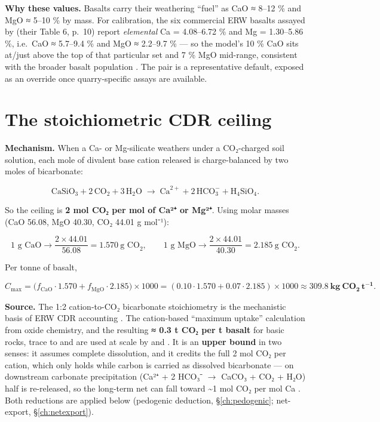 \documentclass[openany]{book}
\begin{document}
\textbf{Why these values.} Basalts carry their weathering ``fuel'' as CaO ≈
8--12 \% and MgO ≈ 5--10 \% by mass. For calibration, the six commercial ERW
basalts assayed by \citet{lewis2021} (their Table 6, p.~10) report
\emph{elemental} Ca = 4.08--6.72 \% and Mg = 1.30--5.86 \%, i.e.~CaO ≈ 5.7--9.4
\% and MgO ≈ 2.2--9.7 \% --- so the model's 10 \% CaO sits at/just above the top
of that particular set and 7 \% MgO mid-range, consistent with the broader
basalt population \citep[Abstract p.~229]{renforth2012}. The pair is a
representative default, exposed as an override once quarry-specific assays are
available.

\chapter{The stoichiometric CDR ceiling}\label{ch:ceiling}

\textbf{Mechanism.} When a Ca- or Mg-silicate weathers under a CO₂-charged soil
solution, each mole of divalent base cation released is charge-balanced by two
moles of bicarbonate:

\[
\text{CaSiO}_3 + 2\,\text{CO}_2 + 3\,\text{H}_2\text{O}
\;\rightarrow\;
\text{Ca}^{2+} + 2\,\text{HCO}_3^- + \text{H}_4\text{SiO}_4 .
\]

So the ceiling is \textbf{2 mol CO₂ per mol of Ca²⁺ or Mg²⁺}. Using molar masses
(CaO 56.08, MgO 40.30, CO₂ 44.01 g mol⁻¹):

\[
\text{1 g CaO} \rightarrow \frac{2\times 44.01}{56.08} = 1.570\ \text{g CO}_2,
\qquad
\text{1 g MgO} \rightarrow \frac{2\times 44.01}{40.30} = 2.185\ \text{g CO}_2 .
\]

Per tonne of basalt,

\[
C_{\max} = \big(f_{\text{CaO}}\cdot 1.570 + f_{\text{MgO}}\cdot 2.185\big)\times 1000
= (0.10\cdot1.570 + 0.07\cdot2.185)\times1000 \approx \mathbf{309.8\ kg\ CO_2\,t^{-1}} .
\]

\textbf{Source.} The 1:2 cation-to-CO₂ bicarbonate stoichiometry is the
mechanistic basis of ERW CDR accounting \citep{hartmann2013}. The cation-based
``maximum uptake'' calculation from oxide chemistry, and the resulting
\textbf{≈ 0.3 t CO₂ per t basalt} for basic rocks, trace to \citet{renforth2012}
and are used at scale by \citet{beerling2020} and \citet{strefler2018}. It is an
\textbf{upper bound} in two senses: it assumes complete dissolution, and it
credits the full 2 mol CO₂ per cation, which only holds while carbon is carried
as dissolved bicarbonate --- on downstream carbonate precipitation
(Ca²⁺ + 2 HCO₃⁻ \(\rightarrow\) CaCO₃ + CO₂ + H₂O) half is re-released, so the
long-term net can fall toward \textasciitilde1 mol CO₂ per mol Ca
\citep{renforth2019}. Both reductions are applied below (pedogenic deduction,
\S\ref{ch:pedogenic}; net-export, \S\ref{ch:netexport}).
\end{document}
